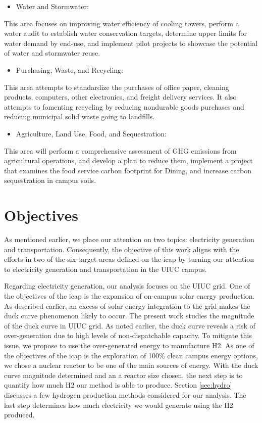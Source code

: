\documentclass[11pt,letterpaper]{article}
\begin{document}
\begin{itemize}
	\item Water and Stormwater:
\end{itemize}
This area focuses on improving water efficiency of cooling towers, perform a water audit to establish water conservation targets, determine upper limits for water demand by end-use, and implement pilot projects to showcase the potential of water and stormwater reuse.

\begin{itemize}
	\item Purchasing, Waste, and Recycling:
\end{itemize}
This area attempts to standardize the purchases of office paper, cleaning products, computers, other electronics, and freight delivery services. It also attempts to fomenting recycling by reducing nondurable goods purchases and reducing municipal solid waste going to landfills.

\begin{itemize}
	\item Agriculture, Land Use, Food, and Sequestration:
\end{itemize}
This area will perform a comprehensive assessment of \gls{GHG} emissions from agricultural operations, and develop a plan to reduce them, implement a project that examines the food service carbon footprint for Dining, and increase carbon sequestration in campus soils.


\section{Objectives}

As mentioned earlier, we place our attention on two topics: electricity generation and transportation.
Consequently, the objective of this work aligns with the efforts in two of the six target areas defined on the \gls{icap} by turning our attention to electricity generation and transportation in the \gls{UIUC} campus.

Regarding electricity generation, our analysis focuses on the \gls{UIUC} grid.
One of the objectives of the \gls{icap} is the expansion of on-campus solar energy production.
As described earlier, an excess of solar energy integration to the grid makes the duck curve phenomenon likely to occur.
The present work studies the magnitude of the duck curve in \gls{UIUC} grid.
As noted earlier, the duck curve reveals a risk of over-generation due to high levels of non-dispatchable capacity.
To mitigate this issue, we propose to use the over-generated energy to manufacture \gls{H2}.
As one of the objectives of the \gls{icap} is the exploration of 100\% clean campus energy options, we chose a nuclear reactor to be one of the main sources of energy.
With the duck curve magnitude determined and an a reactor size chosen, the next step is to quantify how much \gls{H2} our method is able to produce.
Section \ref{sec:hydro} discusses a few hydrogen production methods considered for our analysis.
The last step determines how much electricity we would generate using the \gls{H2} produced.
\end{document}
